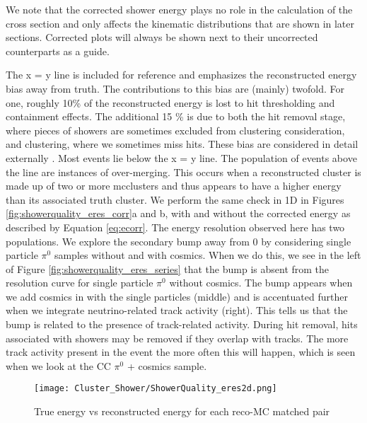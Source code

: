 \noindent We note that the corrected shower energy plays no role in the calculation of the cross section and only affects the kinematic distributions that are shown in later sections. Corrected plots will always be shown next to their uncorrected counterparts as a guide. 
\par The x = y line is included for reference and emphasizes the reconstructed energy bias away from truth. The contributions to this bias are (mainly) twofold. For one, roughly 10\% of the reconstructed energy is lost to hit thresholding and containment effects. The additional 15 \% is due to both the hit removal stage, where pieces of showers are sometimes excluded from clustering consideration, and clustering, where we sometimes miss hits. These bias are considered in detail externally \cite{bib:davidc_hitthresholding} \cite{bib:davidc_missingE}. Most events lie below the x = y line. The population of events above the line are instances of over-merging. This occurs when a reconstructed cluster is made up of two or more mcclusters and thus appears to have a higher energy than its associated truth cluster. We perform the same check in 1D in Figures \ref{fig:showerquality_eres_corr}a and b, with and without the corrected energy as described by Equation \ref{eq:ecorr}. The energy resolution observed here has two populations.  We explore the secondary bump away from 0 by considering single particle $\pi^0$ samples without and with cosmics.  When we do this, we see in the left of Figure \ref{fig:showerquality_eres_series} that the bump is absent from the resolution curve for single particle $\pi^0$ without cosmics.  The bump appears when we add cosmics in with the single particles (middle) and is accentuated further when we integrate neutrino-related track activity (right). This tells us that the bump is related to the presence of track-related activity.  During hit removal, hits associated with showers may be removed if they overlap with tracks.  The more track activity present in the event the more often this will happen, which is seen when we look at the CC $\pi^0$ + cosmics sample.  

\begin{figure}[h!]
\centering
\texttt{[image: Cluster\_Shower/ShowerQuality\_eres2d.png]}
\caption{True energy vs reconstructed energy for each reco-MC matched pair}
\label{fig:showerquality_eres}
\end{figure}


